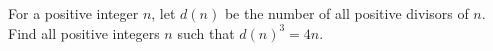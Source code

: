For a positive integer $n$, let $d(n)$ be the number of all positive divisors of $n$. Find all positive integers $n$ such that $d(n)^3 = 4n$.
